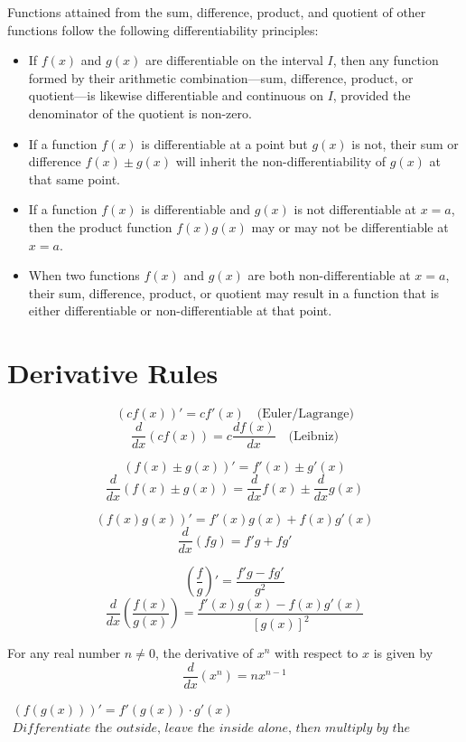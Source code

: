 \documentclass{article}
\newcommand{\theorem}[2]{\begin{tcolorbox}[title={#1},colback=blue!5!white,colframe=blue!75!black,parbox=false] #2 \end{tcolorbox}}
\begin{document}
Functions attained from the sum, difference, product, and quotient of other functions follow the following differentiability principles:
\begin{itemize}
    \item If $f(x)$ and $g(x)$ are differentiable on the interval $I$, then any function formed by their arithmetic combination—sum, difference, product, or quotient—is likewise differentiable and continuous on $I$, provided the denominator of the quotient is non-zero.
    \item If a function $f(x)$ is differentiable at a point but $g(x)$ is not, their sum or difference $f(x) \pm g(x)$ will inherit the non-differentiability of $g(x)$ at that same point.
    \item If a function $f(x)$ is differentiable and $g(x)$ is not differentiable at $x = a$, then the product function $f(x)g(x)$ may or may not be differentiable at $x = a$.
    \item When two functions $f(x)$ and $g(x)$ are both non-differentiable at $x = a$, their sum, difference, product, or quotient may result in a function that is either differentiable or non-differentiable at that point.
\end{itemize}

\section{Derivative Rules}

\theorem{Constant Times a Function}{
\[
(cf(x))' = c f'(x) \quad \text{(Euler/Lagrange)}
\]
\[
\frac{d}{dx}(c f(x)) = c \frac{df(x)}{dx}\quad \text{(Leibniz)}
\]
}

\theorem{Sum/Difference Rule}{
$$(f(x) \pm g(x))' = f'(x) \pm g'(x)$$
$$\frac{d}{dx}(f(x) \pm g(x)) = \frac{d}{dx}f(x) \pm \frac{d}{dx}g(x)$$
}

\theorem{Product Rule}{
$$(f(x)g(x))' = f'(x)g(x) + f(x)g'(x)$$
$$\frac{d}{dx}(fg) = f'g + fg'$$
}

\theorem{Quotient Rule}{
$$\left(\frac{f}{g}\right)' = \frac{f'g - fg'}{g^2}$$
$$\frac{d}{dx}\left(\frac{f(x)}{g(x)}\right) = \frac{f'(x)g(x) - f(x)g'(x)}{[g(x)]^2}$$
}

\theorem{Power Rule}{
For any real number $n \neq 0$, the derivative of $x^n$ with respect to $x$ is given by
$$
\frac{d}{dx}(x^n) = n x^{n-1}
$$
}

\theorem{The Chain Rule}{
\begin{gather*}
    (f(g(x)))' = f'(g(x)) \cdot g'(x)\\
\textit{Differentiate the outside, leave the inside alone, then multiply by the derivative of the inside!}
\end{gather*}
}
\end{document}
